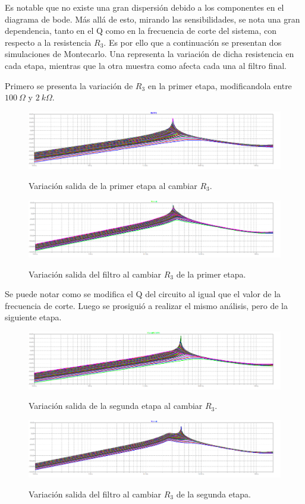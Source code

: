 Es notable que no existe una gran dispersión debido a los componentes en el diagrama de bode. Más allá de esto, mirando las sensibilidades, se nota una gran dependencia, tanto en el Q como en la frecuencia de corte del sistema, con respecto a la resistencia $R_3$. Es por ello que a continuación se presentan dos simulaciones de Montecarlo. Una representa la variación de dicha resistencia en cada etapa, mientras que la otra muestra como afecta cada una al filtro final.

Primero se presenta la variación de $R_3$ en la primer etapa, modificandola entre $100 \ \Omega$ y $2 \ k\Omega$.  
\begin{figure}[H]
	\centering
	\includegraphics[width=\textwidth]{Imagenes-Ej2/presetE1.png}
	\label{fig:mcr3-1}
	\caption{Variación salida de la primer etapa al cambiar $R_3$.}
\end{figure}
\begin{figure}[H]
	\centering
	\includegraphics[width=\textwidth]{Imagenes-Ej2/presetEFE1.png}
	\label{fig:graph}
	\caption{Variación salida del filtro al cambiar $R_3$ de la primer etapa.}
\end{figure}

Se puede notar como se modifica el Q del circuito al igual que el valor de la frecuencia de corte. Luego se prosiguió a realizar el mismo análisis, pero de la siguiente etapa.
\begin{figure}[H]
	\centering
	\includegraphics[width=\textwidth]{Imagenes-Ej2/presetE2.png}
	\label{fig:graph}
	\caption{Variación salida de la segunda etapa al cambiar $R_3$.}
\end{figure}
\begin{figure}[H]
	\centering
	\includegraphics[width=\textwidth]{Imagenes-Ej2/presetEFE2.png}
	\label{fig:graph}
	\caption{Variación salida del filtro al cambiar $R_3$ de la segunda etapa.}
\end{figure}

